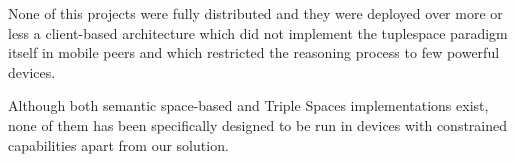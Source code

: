 None of this projects were fully distributed and they were deployed over more or less a client-based architecture which did not implement the tuplespace paradigm itself in mobile peers and which restricted the reasoning process to few powerful devices.




Although both semantic space-based and Triple Spaces implementations exist, none of them has been specifically designed to be run in devices with constrained capabilities apart from our solution.